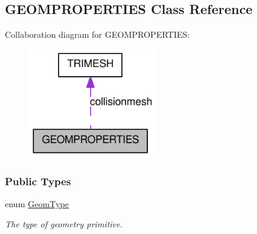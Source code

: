 \hypertarget{classOpenRAVE_1_1KinBody_1_1Link_1_1GEOMPROPERTIES}{
\subsection{GEOMPROPERTIES Class Reference}
\label{classOpenRAVE_1_1KinBody_1_1Link_1_1GEOMPROPERTIES}
}


Collaboration diagram for GEOMPROPERTIES:\nopagebreak
\begin{figure}[H]
\begin{center}
\leavevmode
\includegraphics[width=156pt]{classOpenRAVE_1_1KinBody_1_1Link_1_1GEOMPROPERTIES__coll__graph}
\end{center}
\end{figure}
\subsubsection*{Public Types}
\begin{DoxyCompactItemize}
\item 
enum \hyperlink{classOpenRAVE_1_1KinBody_1_1Link_1_1GEOMPROPERTIES_a49306adaab0c755befa56ed92085f2ae}{GeomType} 
\begin{DoxyCompactList}\small\item\em The type of geometry primitive. \item\end{DoxyCompactList}\end{DoxyCompactItemize}
